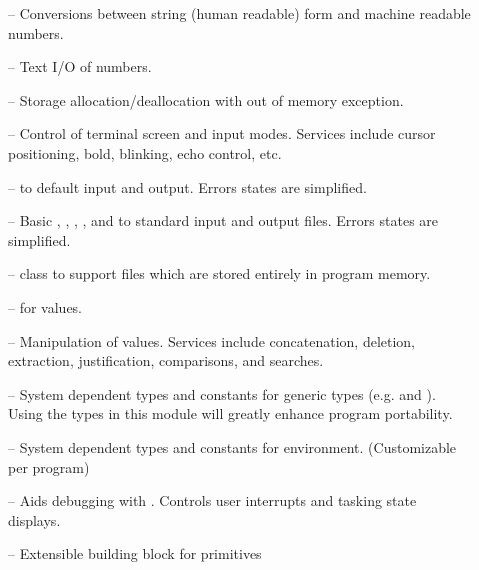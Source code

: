 \begin{description}
\item[] --
    Conversions between string (human readable) form and
    machine readable  numbers.

\item[] --
    Text I/O of  numbers.
    
\item[] --
    Storage allocation/deallocation with out of memory exception.
    
\item[] --
    Control of terminal screen and input modes.  Services include
    cursor positioning, bold, blinking, echo control, etc.
    
\item[] --
     to default  input and output.
    Errors states are simplified.

\item[] --
    Basic , , , , and
     to standard input and output files.
    Errors states are simplified.

\item[] --
     class to
    support files which are stored entirely in program memory.

\item[] --
     for  values.  
    
\item[] --
    Manipulation of  values.  Services include
    concatenation, deletion, extraction, justification, comparisons,
    and searches.
    
\item[] --
    System dependent types and constants for generic types (e.g. 
    and ).  Using the types in this module will greatly
    enhance program portability.

\item[] --
    System dependent types and constants for  environment.
    (Customizable per program)
    
\item[] --
    Aids debugging with .  Controls user interrupts and
    tasking state displays.

\item[] --
    Extensible building block for  primitives 
    

\end{description}
